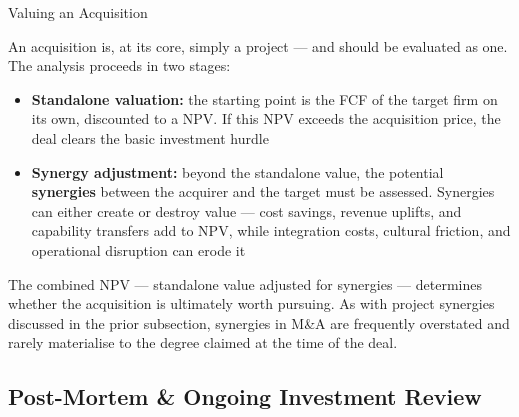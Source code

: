 \documentclass[10pt]{article}
\begin{document}
    \begin{core}{Valuing an Acquisition}

      An acquisition is, at its core, simply a project — and should be evaluated as one. The analysis proceeds in two stages:

      \begin{itemize}

        \item \textbf{Standalone valuation:} the starting point is the FCF of the target firm on its own, discounted to a NPV. If this NPV exceeds the acquisition price, the deal clears the basic investment hurdle

        \item \textbf{Synergy adjustment:} beyond the standalone value, the potential \textbf{synergies} between the acquirer and the target must be assessed. Synergies can either create or destroy value — cost savings, revenue uplifts, and capability transfers add to NPV, while integration costs, cultural friction, and operational disruption can erode it

      \end{itemize}

      The combined NPV — standalone value adjusted for synergies — determines whether the acquisition is ultimately worth pursuing. As with project synergies discussed in the prior subsection, synergies in M\&A are frequently overstated and rarely materialise to the degree claimed at the time of the deal.


    \end{core}

  \subsection{Post-Mortem \& Ongoing Investment Review}
\end{document}
